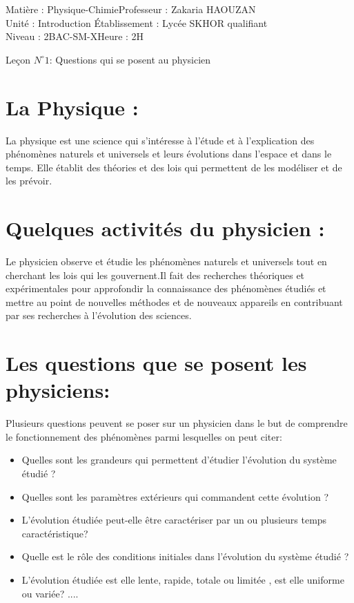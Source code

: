 \documentclass[12pt]{article}
\author{Zakaria HAOUZAN}
\date{\today}
\newcommand\headerMe[2]{\noindent{}#1\hfill#2}
\begin{document}
\headerMe{Matière : Physique-Chimie}{Professeur : Zakaria HAOUZAN}\\
\headerMe{Unité : Introduction }{Établissement : Lycée SKHOR qualifiant}\\
\headerMe{Niveau : 2BAC-SM-X}{Heure : 2H}\\

\begin{center}

    \Large{Leçon $N^{\circ} 1 $: \color{red} Questions qui se posent au physicien  }
\end{center}

\section{ La Physique :}
La physique est une science qui s'intéresse à l'étude et à l'explication des phénomènes naturels et universels et leurs
évolutions dans l'espace et dans le temps. Elle établit des théories et des lois qui permettent
de les modéliser et de les prévoir.

\section{ Quelques activités du physicien : }

Le physicien observe et étudie les phénomènes naturels et universels tout en cherchant les lois qui les gouvernent.Il
fait des recherches théoriques et expérimentales pour approfondir la connaissance des phénomènes étudiés et mettre
au point de nouvelles méthodes et de nouveaux appareils en contribuant par ses recherches à l'évolution des sciences.

\section{Les questions que se posent les physiciens: }
Plusieurs questions peuvent se poser sur un physicien dans le but de comprendre le fonctionnement des phénomènes
parmi lesquelles on peut citer:
\begin{itemize}
   \item Quelles sont les grandeurs qui permettent d'étudier l'évolution du système étudié ?
   \item Quelles sont les paramètres extérieurs qui commandent cette évolution ?
   \item L'évolution étudiée peut-elle être caractériser par un ou plusieurs temps caractéristique?
   \item Quelle est le rôle des conditions initiales dans l'évolution du système étudié ?
   \item L'évolution étudiée est elle lente, rapide, totale ou limitée , est elle uniforme ou variée? ....

\end{itemize}
\end{document}
